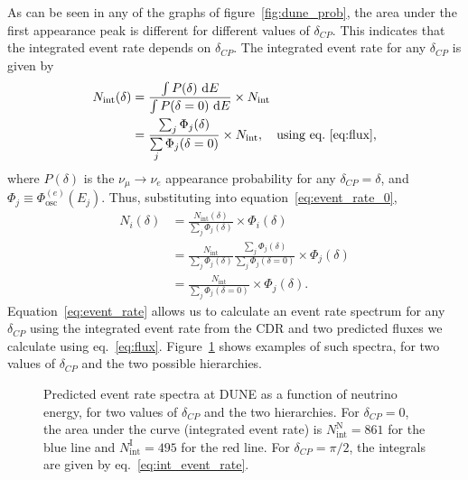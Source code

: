 As can be seen in any of the graphs of figure~\ref{fig:dune_prob}, the area under the first
appearance peak is different for different values of $\delta_{CP}$. This
indicates that the integrated event rate depends on $\delta_{CP}$.
The integrated event rate for any $\delta_{CP}$ is given by
\begin{align}
	N_\text{int} (\delta) &= \frac{\int P (
	\delta)~\mathrm{d} E}{\int P (
	\delta=0)~\mathrm{d} E} \times N_\text{int}\nonumber\\
		&= \frac{\sum_j \Phi_j (\delta) }{\sum\limits_j \Phi_j (\delta=0)} \times
	N_\text{int},\quad\text{using eq.~\ref{eq:flux},}\label{eq:int_event_rate}
\end{align}
where $P(\delta)$ is the $\nu_\mu\rightarrow\nu_e$ appearance probability
for any $\delta_{CP}=\delta$, and $\Phi_j \equiv \Phi^{(e)}_\text{osc}(E_j)$.
Thus, substituting into equation~\ref{eq:event_rate_0},
\begin{align}
	N_i (\delta) &= \frac{N_\text{int}(\delta)}{\sum\limits_j \Phi_j (\delta)}
	\times \Phi_i (\delta)\nonumber\\
	&= \frac{N_\text{int}}{\sum\limits_j \Phi_j (\delta)} \frac{\sum_j \Phi_j
	(\delta)}{\sum\limits_j \Phi_j (\delta=0)} \times \Phi_j(\delta)\nonumber\\
	&= \frac{N_\text{int}}{\sum\limits_j \Phi_j (\delta=0)} \times
	\Phi_j(\delta).\label{eq:event_rate}
\end{align}
Equation~\ref{eq:event_rate} allows us to calculate an event rate spectrum
for any $\delta_{CP}$ using the integrated event rate from the CDR and two
predicted fluxes we calculate using eq.~\ref{eq:flux}.
Figure~\ref{fig:event_rate} shows examples of such spectra, for two values of
$\delta_{CP}$ and the two possible hierarchies.
\begin{figure}
	\centering
	\caption{Predicted event rate spectra at DUNE as a function of neutrino energy, for
	two values of $\delta_{CP}$ and the two hierarchies. For $\delta_{CP}=0$, the
	area under the curve (integrated event rate) is $N^\text{N}_\text{int}=861$ for the
	blue line and
	$N^\text{I}_\text{int}=495$ for the red line. For
	$\delta_{CP}=\pi/2$, the integrals are given by eq.~\ref{eq:int_event_rate}.}
\label{fig:event_rate}
\end{figure}

